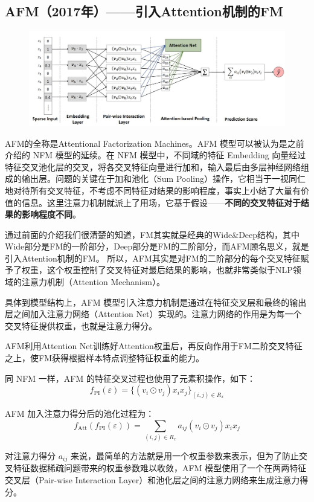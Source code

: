 \documentclass[12pt]{article}
\begin{document}
\subsection{AFM（2017年）——引入Attention机制的FM}
\begin{figure}[H]
    \centering
    \includegraphics[width=.8\textwidth]{fig/AFM_Structure.jpg}
\end{figure}

AFM的全称是Attentional Factorization Machines。AFM 模型可以被认为是之前介绍的 NFM 模型的延续。在 NFM 模型中，不同域的特征 Embedding 向量经过特征交叉池化层的交叉，将各交叉特征向量进行加和，输入最后由多层神经网络组成的输出层。问题的关键在于加和池化（Sum Pooling）操作，它相当于一视同仁地对待所有交叉特征，不考虑不同特征对结果的影响程度，事实上小结了大量有价值的信息。这里注意力机制就派上了用场，它基于假设——\textbf{不同的交叉特征对于结果的影响程度不同}。

通过前面的介绍我们很清楚的知道，FM其实就是经典的Wide\&Deep结构，其中Wide部分是FM的一阶部分，Deep部分是FM的二阶部分，而AFM顾名思义，就是引入Attention机制的FM。
所以，AFM其实是对FM的二阶部分的每个交叉特征赋予了权重，这个权重控制了交叉特征对最后结果的影响，也就非常类似于NLP领域的注意力机制（Attention Mechanism）。

具体到模型结构上，AFM 模型引入注意力机制是通过在特征交叉层和最终的输出层之间加入注意力网络（Attention Net）实现的。注意力网络的作用是为每一个交叉特征提供权重，也就是注意力得分。

AFM利用Attention Net训练好Attention权重后，再反向作用于FM二阶交叉特征之上，使FM获得根据样本特点调整特征权重的能力。

同 NFM 一样，AFM 的特征交叉过程也使用了元素积操作，如下：
$$
f_{\text{PI}}(\varepsilon) = \{(v_i \odot v_j) x_i x_j\}_{(i,j) \in R_x}
$$

AFM 加入注意力得分后的池化过程为：
$$
f_{\text{Att}}(f_{\text{PI}}(\varepsilon)) = \sum_{(i,j) \in R_x}a_{ij}(v_i \odot v_j) x_ix_j
$$

对注意力得分 $a_{ij}$ 来说，最简单的方法就是用一个权重参数来表示，但为了防止交叉特征数据稀疏问题带来的权重参数难以收敛，AFM 模型使用了一个在两两特征交叉层（Pair-wise Interaction Layer）和池化层之间的注意力网络来生成注意力得分。
\end{document}

